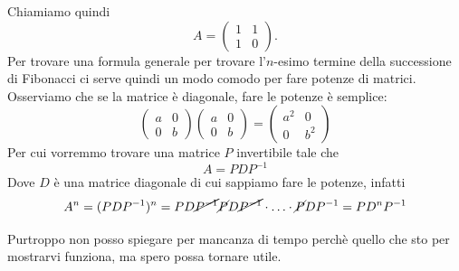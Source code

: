 \documentclass{article}     %
\begin{document}
\grid[4.4cm]{}
Chiamiamo quindi 
\[A =\begin{pmatrix} 1&1\\1&0 \end{pmatrix}.\]
Per trovare una formula generale per trovare l'$n$-esimo termine della successione di Fibonacci ci serve quindi un modo comodo per fare potenze di matrici. Osserviamo che se la matrice è diagonale, fare le potenze è semplice:
\[\begin{pmatrix} a&0\\0&b \end{pmatrix}\begin{pmatrix} a&0\\0&b \end{pmatrix} = \begin{pmatrix} a^2&0\\0&b^2 \end{pmatrix} \]
Per cui vorremmo trovare una matrice $P$ invertibile tale che 
\[A = PDP^{ - 1}\]
Dove $D$ è una matrice diagonale di cui sappiamo fare le potenze, infatti
\[A^{n} =(PDP^{ - 1})^n = PD\cancel{P^{ - 1}}\cancel{P}D\cancel{P^{ - 1}}\cdot \ldots \cdot \cancel{P}DP^{ - 1} = PD^nP^{ - 1}\]

Purtroppo non posso spiegare per mancanza di tempo perchè quello che sto per mostrarvi funziona, ma spero possa tornare utile.
\end{document}
